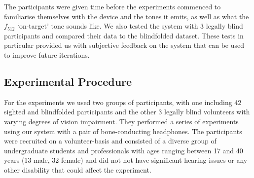 \documentclass[sigconf, review=true, screen=true, anonymous=true]{acmart}
\begin{document}
The participants were given time before the experiments commenced to familiarise themselves with the device and the tones it emits, as well as what the $f_{512}$ `on-target' tone sounds like.
We also tested the system with 3 legally blind participants and compared their data to the blindfolded dataset.
These tests in particular provided us with subjective feedback on the system that can be used to improve future iterations.

\subsection{Experimental Procedure}

For the experiments we used two groups of participants, with one including 42 sighted and blindfolded participants and the other 3 legally blind volunteers with varying degrees of vision impairment. 
They performed a series of experiments using our system with a pair of bone-conducting headphones.
The participants were recruited on a volunteer-basis and consisted of a diverse group of undergraduate students and professionals with ages ranging between 17 and 40 years (13 male, 32 female) and did not not have significant hearing issues or any other disability that could affect the experiment.


\end{document}
